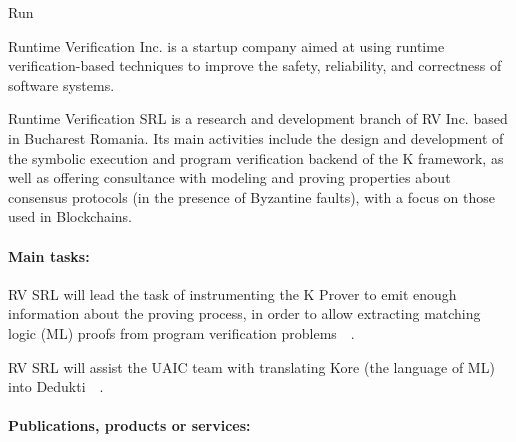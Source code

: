 \begin{sitedescription}{Run}



Runtime Verification Inc. is a startup company aimed at using runtime verification-based
techniques to improve the safety, reliability, and correctness of software systems.

Runtime Verification SRL is a research and development branch of RV Inc. based
in Bucharest Romania.  Its main activities include the design and development of
the symbolic execution and program verification backend of the K framework,
as well as offering consultance with modeling and proving properties about
consensus protocols (in the presence of Byzantine faults),
with a focus on those used in Blockchains.

\paragraph*{Main tasks:}



\begin{compactitem}
\item RV SRL will lead the task of instrumenting the K Prover to emit enough information
about the proving process, in order to allow extracting matching logic (ML)
proofs from program verification problems~~.
\item RV SRL will assist the UAIC team with translating Kore (the language of ML)
into Dedukti~~.
\end{compactitem}

\paragraph*{Publications, products or services:}



\end{sitedescription}

